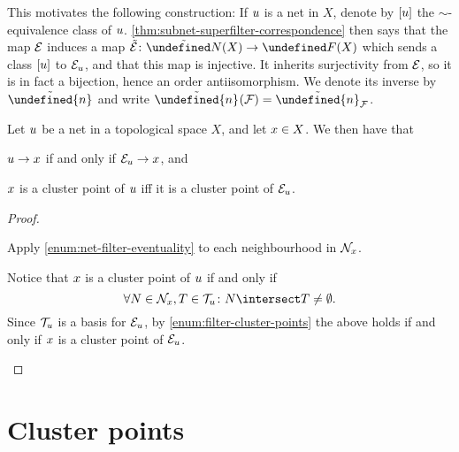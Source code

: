 \documentclass[article, a4paper, 11pt, oneside]{memoir}
\let\mathfrak\undefined
\numberwithin{equation}{chapter}
\newcommand{\calF}{\mathcal{F}}
\theoremstyle{nonumberplain}
\begin{document}
\newcommand{\myinv}[1][]{\tilde{\mathfrak{n}}_{#1}}

This motivates the following construction: If $\mynet$ is a net in $X$, denote by $[\mynet]$ the $\sim$-equivalence class of $\mynet$. \cref{thm:subnet-superfilter-correspondence} then says that the map $\evfilt$ induces a map $\evfilteq \colon \netseq{X} \to \filters{X}$ which sends a class $[\mynet]$ to $\evfilt[\mynet]$, and that this map is injective. It inherits surjectivity from $\evfilt$, so it is in fact a bijection, hence an order antiisomorphism. We denote its inverse by $\myinv$ and write $\myinv(\calF) = \myinv[\calF]$.


\begin{corollary}
    Let $\mynet$ be a net in a topological space $X$, and let $\mylimit \in X$. We then have that
    \begin{enumcor}
        \item \label{enum:net-filter-convergence} $\mynet \to \mylimit$ if and only if $\evfilt[\mynet] \to \mylimit$, and
        \item \label{enum:net-filter-cluster} $\mylimit$ is a cluster point of $\mynet$ iff it is a cluster point of $\evfilt[\mynet]$.
    \end{enumcor}
\end{corollary}

\begin{proof}
    \begin{proofsec}
        \item[\subcref{enum:net-filter-convergence}]
        Apply \cref{enum:net-filter-eventuality} to each neighbourhood in $\nhoods{\mylimit}$.

        \item[\subcref{enum:net-filter-cluster}]
        Notice that $\mylimit$ is a cluster point of $\mynet$ if and only if
        \begin{equation*}
            \forall N \in \nhoods{\mylimit}, T \in \tails{\mynet} \colon N \intersect T \neq \emptyset.
        \end{equation*}
        Since $\tails{\mynet}$ is a basis for $\evfilt[\mynet]$, by \cref{enum:filter-cluster-points} the above holds if and only if $\mylimit$ is a cluster point of $\evfilt[\mynet]$.
    \end{proofsec}
\end{proof}


\chapter{Cluster points}
\end{document}
